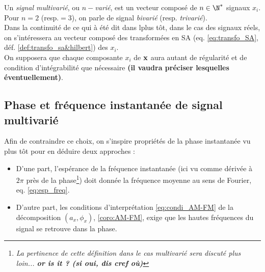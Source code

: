 \begin{definition}\label{def:signal_multivar}
	Un \emph{signal multivarié}, ou \emph{$n-$varié}, est un vecteur composé de $n\in\N^*$ signaux $x_i$. Pour $n=2$ (resp.$=3$), on parle de signal \emph{bivarié} (resp. \emph{trivarié}).
	\\
	Dans la continuité de ce qui à été dit dans lplus tôt, dans le cas des signaux réels, on s'intéressera au vecteur composé des transformées en SA (eq. \eqref{eq:transfo_SA}, déf. \ref{def:transfo_sa&hilbert}) des $x_i$.
	\\
	On supposera que chaque composante $x_i$ de $\bf{x}$ aura autant de régularité et de condition d'intégrabilité que nécessaire \textbf{(il vaudra préciser lesquelles éventuellement)}.
\end{definition}




\subsection{Phase et fréquence instantanée de signal multivarié }\label{sec:param_instant_nvar}

Afin de contraindre ce choix, on s'inspire propriétés de la phase instantanée vu plus tôt pour en déduire deux approches :
\begin{itemize}
	\item D'une part, l'espérance de la fréquence instantanée (ici vu comme dérivée à $2\pi$ près de la phase\footnote{\itshape
		La pertinence de cette définition dans le cas multivarié sera discuté plus loin... \textbf{or is it ? (si oui, dis cref où)}})
	doit donnée la fréquence moyenne au sens de Fourier, eq. \eqref{eq:esp_freq}.
	
	\item D'autre part, les conditions d'interprétation \eqref{eq:condi_AM-FM} de la décomposition $(a_x,\phi_x)$, \cref{coro:AM-FM}, exige que les hautes fréquences du signal se retrouve dans la phase.
\end{itemize}

